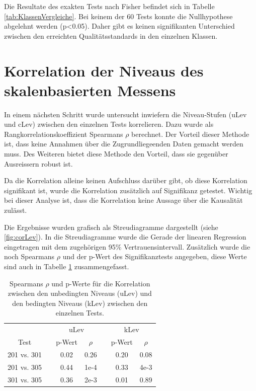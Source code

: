 Die Resultate des exakten Tests nach Fisher befindet sich in Tabelle \ref{tab:KlassenVergleiche}. Bei keinem der 60 Tests konnte die Nullhypothese abgelehnt werden (p<0.05). Daher gibt es keinen signifikanten Unterschied zwischen den erreichten Qualitätsstandards in den einzelnen Klassen.  

\section{Korrelation der Niveaus des skalenbasierten Messens}

In einem nächsten Schritt wurde untersucht inwiefern die Niveau-Stufen (uLev und cLev) zwischen den einzelnen Tests korrelieren. Dazu wurde als Rangkorrelationskoeffizient Spearmans $\rho$ berechnet. Der Vorteil dieser Methode ist, dass keine Annahmen über die Zugrundliegeenden Daten gemacht werden muss. Des Weiteren bietet diese Methode den Vorteil, dass sie gegenüber Ausreissern robust ist. 

Da die Korrelation alleine keinen Aufschluss darüber gibt, ob diese Korrelation signifikant ist, wurde die Korrelation zusätzlich auf Signifikanz getestet. Wichtig bei dieser Analyse ist, dass die Korrelation keine Aussage über die Kausalität zulässt.


Die Ergebnisse wurden grafisch als Streudiagramme dargestellt (siehe \ref{fig:corLev}). In die Streudiagramme wurde die Gerade der linearen Regression eingetragen mit dem zugehörigen 95\% Vertrauensintervall. Zusätzlich wurde die noch Spearmans $\rho$ und der p-Wert des Signifikanztests angegeben, diese Werte sind auch in Tabelle \ref{tab:CorNiveau} zusammengefasst.



\begin{table}[htbp]
  \centering
\begin{tabular}{ccccccc}
\toprule
 &&  \multicolumn{2}{c}{uLev} &&  \multicolumn{2}{c}{kLev}\\ 
 Test && p-Wert & $\rho$ && p-Wert & $\rho$  \\ 
\midrule
 201 vs. 301 &&   0.02 & 0.26 && 0.20 & 0.08    \\ 
 201 vs. 305 &&   0.44 & 1e-4 && 0.33 & 4e-3      \\
 301 vs. 305 &&   0.36 & 2e-3 && 0.01 & 0.89    \\
\bottomrule
\end{tabular} 
  \caption{Spearmans $\rho$ und p-Werte für die Korrelation zwischen den unbedingten Niveaus (uLev) und den bedingten Niveaus (kLev) zwischen den einzelnen Tests.  }
  \label{tab:CorNiveau}
\end{table}
 
